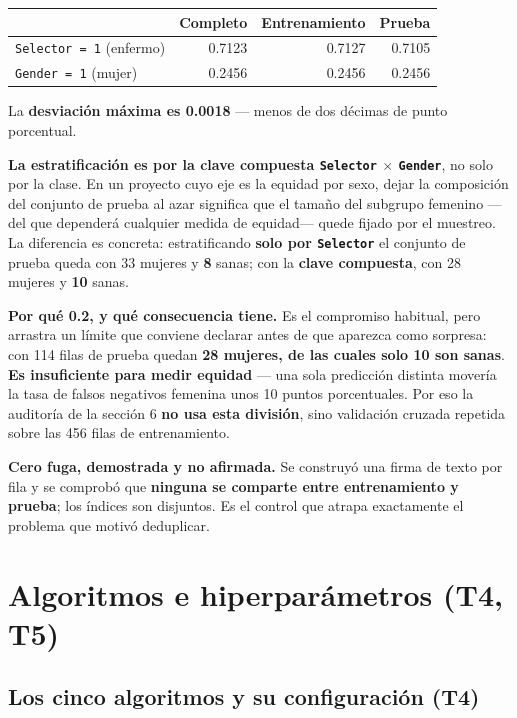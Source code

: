 \documentclass[10pt,a4paper]{article}
\begin{document}
\begin{table}[H]
\footnotesize
\centering
\begin{tabular}{@{}l r r r@{}}
\toprule
& \textbf{Completo} & \textbf{Entrenamiento} & \textbf{Prueba} \\
\midrule
\texttt{Selector = 1} (enfermo) & 0.7123 & 0.7127 & 0.7105 \\
\texttt{Gender = 1} (mujer) & 0.2456 & 0.2456 & 0.2456 \\
\bottomrule
\end{tabular}
\end{table}

La \textbf{desviación máxima es 0.0018} --- menos de dos décimas de punto porcentual.

\textbf{La estratificación es por la clave compuesta \texttt{Selector} $\times$ \texttt{Gender}}, no solo por la clase. En un proyecto cuyo eje es la equidad por sexo, dejar la composición del conjunto de prueba al azar significa que el tamaño del subgrupo femenino ---del que dependerá cualquier medida de equidad--- quede fijado por el muestreo. La diferencia es concreta: estratificando \textbf{solo por \texttt{Selector}} el conjunto de prueba queda con 33 mujeres y \textbf{8} sanas; con la \textbf{clave compuesta}, con 28 mujeres y \textbf{10} sanas.

\textbf{Por qué 0.2, y qué consecuencia tiene.} Es el compromiso habitual, pero arrastra un límite que conviene declarar antes de que aparezca como sorpresa: con 114 filas de prueba quedan \textbf{28 mujeres, de las cuales solo 10 son sanas}. \textbf{Es insuficiente para medir equidad} --- una sola predicción distinta movería la tasa de falsos negativos femenina unos 10 puntos porcentuales. Por eso la auditoría de la sección 6 \textbf{no usa esta división}, sino validación cruzada repetida sobre las 456 filas de entrenamiento.

\textbf{Cero fuga, demostrada y no afirmada.} Se construyó una firma de texto por fila y se comprobó que \textbf{ninguna se comparte entre entrenamiento y prueba}; los índices son disjuntos. Es el control que atrapa exactamente el problema que motivó deduplicar.

\section{Algoritmos e hiperparámetros (T4, T5)}

\subsection{Los cinco algoritmos y su configuración (T4)}
\end{document}
